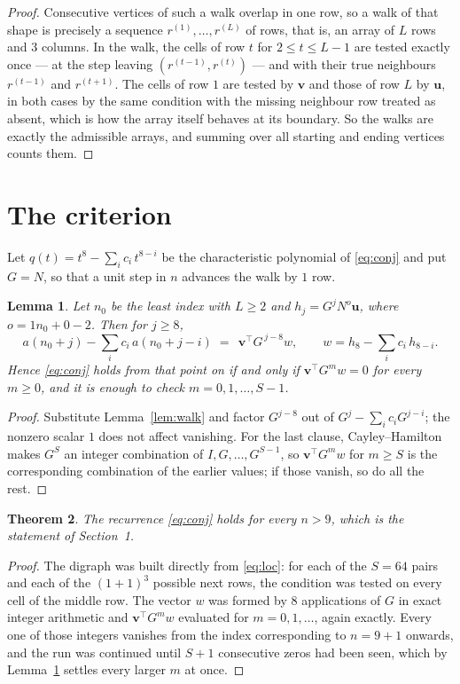 \documentclass[11pt,a4paper]{article}
\theoremstyle{plain}
\newtheorem{theorem}{Theorem}
\newtheorem{lemma}[theorem]{Lemma}
\theoremstyle{definition}
\begin{document}
\begin{proof}
Consecutive vertices of such a walk overlap in one row, so a walk of that shape is
precisely a sequence $r^{(1)},\dots,r^{(L)}$ of rows, that is, an array of $L$ rows
and $3$ columns. In the walk, the cells of row $t$ for $2\le t\le L-1$ are tested
exactly once --- at the step leaving $(r^{(t-1)},r^{(t)})$ --- and with their true
neighbours $r^{(t-1)}$ and $r^{(t+1)}$. The cells of row $1$ are tested by
$\mathbf{v}$ and those of row $L$ by $\mathbf{u}$, in both cases by the same condition
with the missing neighbour row treated as absent, which is how the array itself behaves at
its boundary. So the walks are exactly the admissible arrays, and summing over all starting
and ending vertices counts them.
\end{proof}

\section{The criterion}

Let $q(t)=t^{8}-\sum_i c_i\,t^{8-i}$ be the characteristic polynomial of
\eqref{eq:conj} and put $G=N$, so that a unit step in $n$ advances the walk by
$1$ row.

\begin{lemma}\label{lem:crit}
Let $n_0$ be the least index with $L\ge2$ and $h_j=G^{j}N^{o}\mathbf{u}$, where
$o=1n_0+0-2$. Then for $j\ge8$,
\[
a(n_0+j)-\sum_i c_i\,a(n_0+j-i)\;=\;\,\mathbf{v}^{\!\top}G^{\,j-8}w,
\qquad w=h_{8}-\sum_i c_i\,h_{8-i} .
\]
Hence \eqref{eq:conj} holds from that point on if and only if
$\mathbf{v}^{\!\top}G^{m}w=0$ for every $m\ge0$, and it is enough to check
$m=0,1,\dots,S-1$.
\end{lemma}

\begin{proof}
Substitute Lemma~\ref{lem:walk} and factor $G^{j-8}$ out of
$G^{j}-\sum_ic_iG^{j-i}$; the nonzero scalar $1$ does not affect
vanishing. For the last clause, Cayley--Hamilton makes $G^{S}$ an integer combination of
$I,G,\dots,G^{S-1}$, so $\mathbf{v}^{\!\top}G^{m}w$ for $m\ge S$ is the corresponding
combination of the earlier values; if those vanish, so do all the rest.
\end{proof}

\begin{theorem}
The recurrence \eqref{eq:conj} holds for every $n>9$, which is the statement of
Section~1.
\end{theorem}

\begin{proof}
The digraph was built directly from \eqref{eq:loc}: for each of the $S=64$ pairs and each
of the $(1+1)^{3}$ possible next rows, the condition was tested on every cell of
the middle row. The vector $w$ was formed by $8$ applications of $G$ in exact integer
arithmetic and $\mathbf{v}^{\!\top}G^{m}w$ evaluated for $m=0,1,\dots$, again exactly.
Every one of those integers vanishes from the index corresponding to $n=9+1$ onwards,
and the run was continued until $S+1$ consecutive zeros had been seen, which by
Lemma~\ref{lem:crit} settles every larger $m$ at once.
\end{proof}
\end{document}
